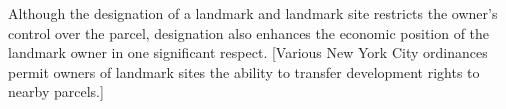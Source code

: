 %

Although the designation of a landmark and landmark site restricts the owner's
control over the parcel, designation also enhances the economic position of the
landmark owner in one significant respect.
[Various New York City ordinances permit owners of landmark sites the ability to
transfer development rights to nearby parcels.]


